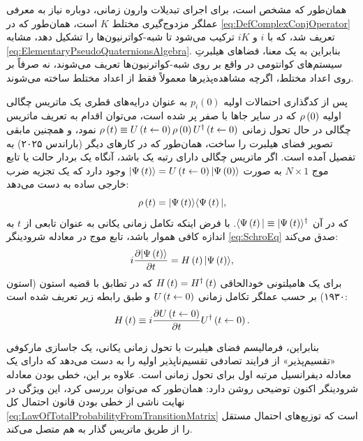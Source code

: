 \documentclass{article}
\newcommand{\timeevop}{U}
\begin{document}
همان‌طور که مشخص است، برای اجرای تبدیلات وارون زمانی، دوباره نیاز به معرفی عملگر مزدوج‌گیری مختلط $K$ است، همان‌طور که در \eqref{eq:DefComplexConjOperator} تعریف شد، که با $i$ و $iK$ ترکیب می‌شود تا شبه-کواترنیون‌ها را تشکیل دهد، مشابه \eqref{eq:ElementaryPseudoQuaternionsAlgebra}. بنابراین به یک معنا، فضاهای هیلبرتِ سیستم‌های کوانتومی در واقع بر روی شبه-کواترنیون‌ها تعریف می‌شوند، نه صرفاً بر روی اعداد مختلط، اگرچه مشاهده‌پذیرها معمولاً فقط از اعداد مختلط ساخته می‌شوند.

پس از کدگذاری احتمالات اولیه $p_{i}\left(0\right)$ به عنوان درایه‌های قطری یک ماتریس چگالی اولیه $\rho\left(0\right)$ که در سایر جاها با صفر پر شده است، می‌توان اقدام به تعریف ماتریس چگالی در حال تحول زمانی $\densitymatrix\left(t\right)\defeq\timeevop\left(t\from0\right)\densitymatrix\left(0\right)\timeevop^{\adj}\left(t\from0\right)$ نمود، و همچنین مابقی تصویر فضای هیلبرت را ساخت، همان‌طور که در کارهای دیگر (باراندس ۲۰۲۵)\nocite{Barandes:2025tsqc} به تفصیل آمده است. اگر ماتریس چگالی دارای رتبه یک باشد، آنگاه یک بردار حالت یا تابع موج $N\times1$ به صورت $\ket{\Psi\left(t\right)}=\timeevop\left(t\from0\right)\ket{\Psi\left(0\right)}$ وجود دارد که یک تجزیه ضرب خارجی ساده به دست می‌دهد:
\begin{equation}
\rho\left(t\right)=\vert\Psi\left(t\right)\rangle\langle\Psi\left(t\right)\vert,\label{eq:RankOneDensityMatrixFromStateVector}
\end{equation}
که در آن $\langle\Psi\left(t\right)\vert\equiv\vert\Psi\left(t\right)\rangle^{\dagger}$.
با فرض اینکه تکامل زمانی یکانی به عنوان تابعی از $t$ به اندازه کافی هموار باشد، تابع موج در معادله شرودینگر \eqref{eq:SchroEq} صدق می‌کند:
\[
i\frac{\partial\vert\Psi\left(t\right)\rangle}{\partial t}=H\left(t\right)\vert\Psi\left(t\right)\rangle,
\]
برای یک هامیلتونی خودالحاقی $H\left(t\right)=H^{\dagger}\left(t\right)$ که در تطابق با قضیه استون (استون ۱۹۳۰)\nocite{Stone:1930ltihs} بر حسب عملگر تکامل زمانی $\timeevop\left(t\from0\right)$ و طبق رابطه زیر تعریف شده است:
\begin{equation}
H\left(t\right)\defeq i\frac{\partial\timeevop\left(t\from0\right)}{\partial t}\timeevop^{\adj}\left(t\from0\right).\label{eq:DefQuantumHamiltonian}
\end{equation}

بنابراین، فرمالیسم فضای هیلبرت با تحول زمانی یکانی، یک جاسازی مارکوفی «تقسیم‌پذیر» از فرایند تصادفی تقسیم‌ناپذیر اولیه را به دست می‌دهد که دارای یک معادله دیفرانسیل مرتبه اول برای تحول زمانی است. علاوه بر این، خطی بودن معادله شرودینگر اکنون توضیحی روشن دارد: همان‌طور که می‌توان بررسی کرد، این ویژگی در نهایت ناشی از خطی بودن قانون احتمال کل \eqref{eq:LawOfTotalProbabilityFromTransitionMatrix} است که توزیع‌های احتمال مستقل را از طریق ماتریس گذار به هم متصل می‌کند.
\end{document}
